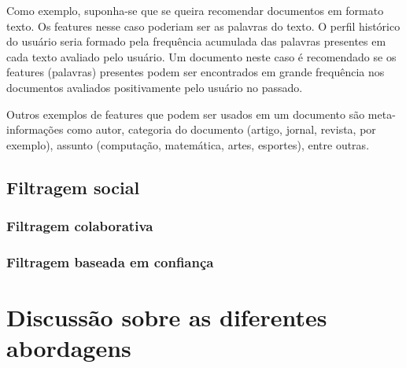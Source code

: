 Como exemplo, suponha-se que se queira recomendar documentos em formato texto. Os features nesse caso poderiam ser as palavras do texto. O perfil histórico do usuário seria formado pela frequência acumulada das palavras presentes em cada texto avaliado pelo usuário. Um documento neste caso é recomendado se os features (palavras) presentes podem ser encontrados em grande frequência nos documentos avaliados positivamente pelo usuário no passado.

Outros exemplos de features que podem ser usados em um documento são meta-informações como autor, categoria do documento (artigo, jornal, revista, por exemplo), assunto (computação, matemática, artes, esportes), entre outras.

\subsection{Filtragem social} %

\subsubsection{Filtragem colaborativa}

\subsubsection{Filtragem baseada em confiança} %

\section{Discussão sobre as diferentes abordagens}

